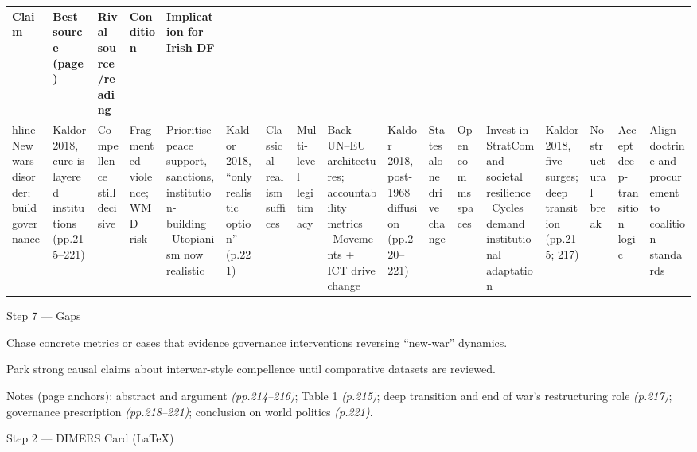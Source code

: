 \begin{tabular}{p{3.2cm}p{4.2cm}p{3.6cm}p{3.2cm}p{4.2cm}}
	\textbf{Claim} & \textbf{Best source (page)} & \textbf{Rival source/reading} & \textbf{Condition} & \textbf{Implication for Irish DF}\\hline
	New wars disorder; build governance & Kaldor 2018, cure is layered institutions (pp.215–221) & Compellence still decisive & Fragmented violence; WMD risk & Prioritise peace support, sanctions, institution-building \
	Utopianism now realistic & Kaldor 2018, “only realistic option” (p.221) & Classical realism suffices & Multi-level legitimacy & Back UN–EU architectures; accountability metrics \
	Movements + ICT drive change & Kaldor 2018, post-1968 diffusion (pp.220–221) & States alone drive change & Open comms spaces & Invest in StratCom and societal resilience \
	Cycles demand institutional adaptation & Kaldor 2018, five surges; deep transition (pp.215; 217) & No structural break & Accept deep-transition logic & Align doctrine and procurement to coalition standards \
\end{tabular}

Step 7 — Gaps

Chase concrete metrics or cases that evidence governance interventions reversing “new-war” dynamics.

Park strong causal claims about interwar-style compellence until comparative datasets are reviewed.

Notes (page anchors): abstract and argument \emph{(pp.214–216)}; Table 1 \emph{(p.215)}; deep transition and end of war’s restructuring role \emph{(p.217)}; governance prescription \emph{(pp.218–221)}; conclusion on world politics \emph{(p.221)}.

\parencite{KALDOR_2003}

Step 2 — DIMERS Card (LaTeX)


